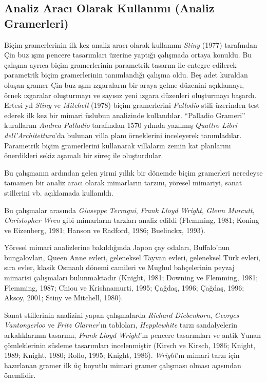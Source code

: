 \documentclass[12pt,turkish,a4paperpaper,]{report}
\begin{document}
\hypertarget{analiz-aracux131-olarak-kullanux131mux131-analiz-gramerleri}{%
\subsection{Analiz Aracı Olarak Kullanımı (Analiz
Gramerleri)}\label{analiz-aracux131-olarak-kullanux131mux131-analiz-gramerleri}}

Biçim gramerlerinin ilk kez analiz aracı olarak kullanımı \emph{Stiny}
(1977) tarafından Çin buz ışını pencere tasarımları üzerine yaptığı
çalışmada ortaya konuldu. Bu çalışma ayrıca biçim gramerlerinin
parametrik tasarım ile entegre edilerek parametrik biçim gramerlerinin
tanımlandığı çalışma oldu. Beş adet kuraldan oluşan gramer Çin buz ışını
ızgaraların bir araya gelme düzenini açıklamayı, örnek ızgaralar
oluşturmayı ve sayısız yeni ızgara düzenleri oluşturmayı başardı. Ertesi
yıl \emph{Stiny} ve \emph{Mitchell} (1978) biçim gramerlerini
\emph{Pallodio} stili üzerinden test ederek ilk kez bir mimari üslubun
analizinde kullandılar. ``Palladio Grameri'' kurallarını \emph{Andrea
Palladio} tarafından 1570 yılında yazılmış \emph{Quattro Libri
dell'Architettura}'da bulunan villa planı örneklerini inceleyerek
tanımladılar. Parametrik biçim gramerlerini kullanarak villaların zemin
kat planlarını önerdikleri sekiz aşamalı bir süreç ile oluşturdular.

Bu çalışmanın ardından gelen yirmi yıllık bir dönemde biçim gramerleri
neredeyse tamamen bir analiz aracı olarak mimarların tarzını, yöresel
mimariyi, sanat stillerini vb. açıklamada kullanıldı.

Bu çalışmalar arasında \emph{Giuseppe Terragni}, \emph{Frank Lloyd
Wright}, \emph{Glenn Murcutt}, \emph{Christopher Wren} gibi mimarların
tarzları analiz edildi (Flemming, 1981; Koning ve Eizenberg, 1981;
Hanson ve Radford, 1986; Buelinckx, 1993).

Yöresel mimari analizlerine bakıldığında Japon çay odaları, Buffalo'nun
bungalovları, Queen Anne evleri, geleneksel Tayvan evleri, geleneksel
Türk evleri, sıra evler, klasik Osmanlı dönemi camileri ve Mughul
bahçelerinin peyzaj mimarisi çalışmaları bulunmaktadır (Knight, 1981;
Downing ve Flemming, 1981; Flemming, 1987; Chiou ve Krishnamurti, 1995;
Çağdaş, 1996; Çağdaş, 1996; Aksoy, 2001; Stiny ve Mitchell, 1980).

Sanat stillerinin analizini yapan çalışmalarda \emph{Richard
Diebenkorn}, \emph{Georges Vantongerloo} ve \emph{Fritz Glarner}'ın
tabloları, \emph{Hepplewhite} tarzı sandalyelerin arkalıklarının
tasarımı, \emph{Frank Lloyd Wright}'ın pencere tasarımları ve antik
Yunan çömleklerinin süsleme tasarımları incelenmiştir (Kirsch ve Kirsch,
1986; Knight, 1989; Knight, 1980; Rollo, 1995; Knight, 1986).
\emph{Wright}'ın mimari tarzı için hazırlanan gramer ilk üç boyutlu
mimari gramer çalışması olması açısından önemlidir.
\end{document}
